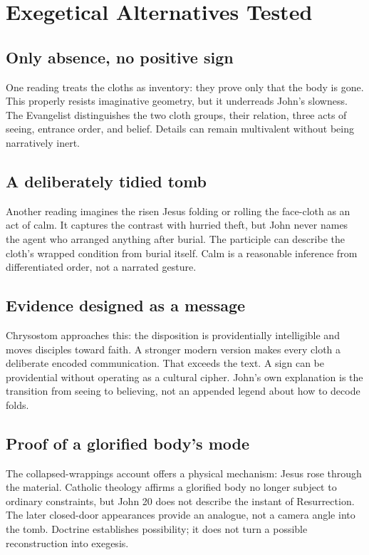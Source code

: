 \section{Exegetical Alternatives Tested}

\subsection{Only absence, no positive sign}

One reading treats the cloths as inventory: they prove only that the body is
gone. This properly resists imaginative geometry, but it underreads John's
slowness. The Evangelist distinguishes the two cloth groups, their relation,
three acts of seeing, entrance order, and belief. Details can remain
multivalent without being narratively inert.

\subsection{A deliberately tidied tomb}

Another reading imagines the risen Jesus folding or rolling the face-cloth as
an act of calm. It captures the contrast with hurried theft, but John never
names the agent who arranged anything after burial. The participle can describe
the cloth's wrapped condition from burial itself. Calm is a reasonable
inference from differentiated order, not a narrated gesture.

\subsection{Evidence designed as a message}

Chrysostom approaches this: the disposition is providentially intelligible and
moves disciples toward faith. A stronger modern version makes every cloth a
deliberate encoded communication. That exceeds the text. A sign can be
providential without operating as a cultural cipher. John's own explanation is
the transition from seeing to believing, not an appended legend about how to
decode folds.

\subsection{Proof of a glorified body's mode}

The collapsed-wrappings account offers a physical mechanism: Jesus rose through
the material. Catholic theology affirms a glorified body no longer subject to
ordinary constraints, but John 20 does not describe the instant of
Resurrection. The later closed-door appearances provide an analogue, not a
camera angle into the tomb. Doctrine establishes possibility; it does not turn
a possible reconstruction into exegesis.


